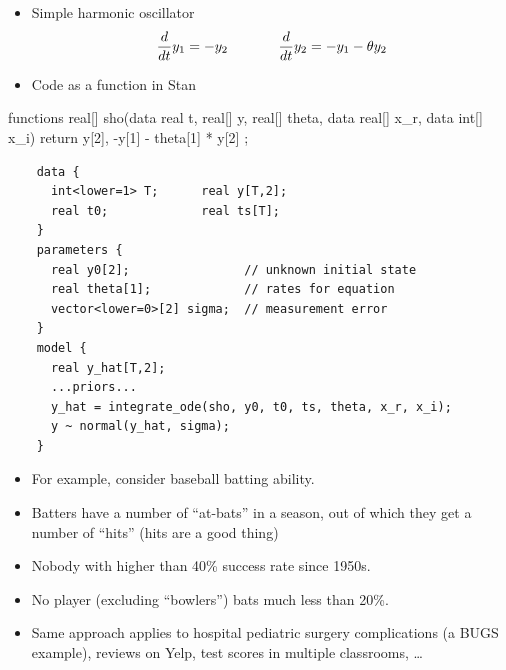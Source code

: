 \documentclass[10pt]{report}
\begin{document}
%
\begin{itemize}
\item Simple harmonic oscillator
{\small
\begin{equation*}
\frac{d}{dt} y_1 = -y_2
\hspace*{0.5in}
\frac{d}{dt} y_2 = -y_1 - \theta y_2
\end{equation*}
}
\item Code as a function in Stan
\end{itemize}
\begin{stancode}
functions {
  real[] sho(data real t, real[] y, real[] theta,
             data real[] x_r, data int[] x_i) {
    return { y[2],
             -y[1] - theta[1] * y[2] };
  }
}
\end{stancode}


%
{\footnotesize
\begin{Verbatim}
    data {
      int<lower=1> T;      real y[T,2];
      real t0;             real ts[T];
    }
    parameters {
      real y0[2];                // unknown initial state
      real theta[1];             // rates for equation
      vector<lower=0>[2] sigma;  // measurement error
    }
    model {
      real y_hat[T,2];
      ...priors...
      y_hat = integrate_ode(sho, y0, t0, ts, theta, x_r, x_i);
      y ~ normal(y_hat, sigma);
    }
\end{Verbatim}
}





%
\begin{itemize}
\item For example, consider baseball batting ability.
\item Batters have a number of ``at-bats'' in a season, out of which they
  get a number of ``hits'' (hits are a good thing)
\item Nobody with higher than 40\% success rate since 1950s.
\item No player (excluding ``bowlers'') bats much less than 20\%.
\item Same approach applies to hospital pediatric surgery
  complications (a BUGS example), reviews on Yelp,
  test scores in multiple classrooms, \ldots
\end{itemize}
\end{document}
